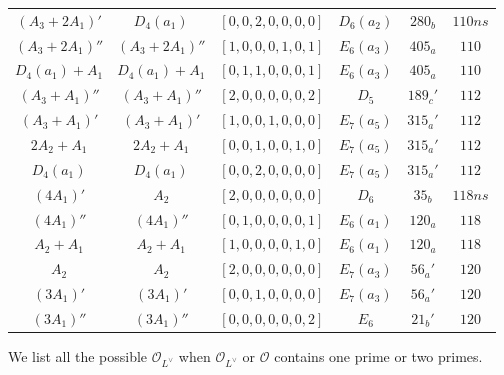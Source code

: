 \documentclass[reqno,12pt]{amsart}
\numberwithin{equation}{section}
\theoremstyle{plain}
\theoremstyle{definition}
\begin{document}
\begin{table}[htbp]
{\begin{tabular}{|c|c|c|c|c|c|}
$(A_3+2A_1)'$&$D_4(a_1)$  
&$[0,0,2,0,0,0,0]$& $D_6(a_2)$  & $ 280_b$  &   $110ns$ \\
$(A_3+2A_1)''$
&$(A_3+2A_1)''$
&$[1,0,0,0,1,0,1]$& $E_6(a_3)$  & $ 405_a$  &   $110$ \\
$D_4(a_1)+A_1$
&$D_4(a_1)+A_1$
&$[0,1,1,0,0,0,1]$& $E_6(a_3)$  & $ 405_a$  &   $110$ \\
\hline


$(A_3+A_1)''$
& $(A_3+A_1)''$
&$[2,0,0,0,0,0,2]$& $D_5$  & $ 189_c'$  &  $112$ \\

$(A_3+A_1)'$
& $(A_3+A_1)'$
&$[1,0,0,1,0,0,0]$&$E_7(a_5)$  & $ 315_a'$  &   $112$ \\
$2A_2+A_1$
&$2A_2+A_1$
&$[0,0,1,0,0,1,0]$& $E_7(a_5)$  & $ 315_a'$  &   $112$ \\
$D_4(a_1)$
&$D_4(a_1)$
&$[0,0,2,0,0,0,0]$&$E_7(a_5)$  & $ 315_a'$  &   $112$ \\
\hline




$(4A_1)'$ &$A_2$
&$[2,0,0,0,0,0,0]$& $D_6$  & $ 35_b$  &   $118ns$ \\
$(4A_1)''$
&  $(4A_1)''$
&$[0,1,0,0,0,0,1]$&  $E_6(a_1)$  &  $ 120_a$  &   $118$ \\
$A_2+A_1$
& $A_2+A_1$
&$[1,0,0,0,0,1,0]$&$E_6(a_1)$  & $ 120_a$  &   $118$ \\
\hline

$A_2$
& $A_2$
&$[2,0,0,0,0,0,0]$&  $E_7(a_3)$  &  $ 56_a'$  &   $120$ \\
$(3A_1)'$
& $(3A_1)'$
&$[0,0,1,0,0,0,0]$&   $E_7(a_3)$  &  $ 56_a'$  &   $120$ \\
$(3A_1)''$
& $(3A_1)''$
&$[0,0,0,0,0,0,2]$& $E_6$  & $ 21_b'$  &   $120$ \\
\hline



\end{tabular}}
	\bigskip
	
We list all the possible $\mathcal{O}_{L^\vee}$ when $\mathcal{O}_{L^\vee}$ or $\mathcal{O}$ contains one prime or two primes.
\end{table}
\end{document}
